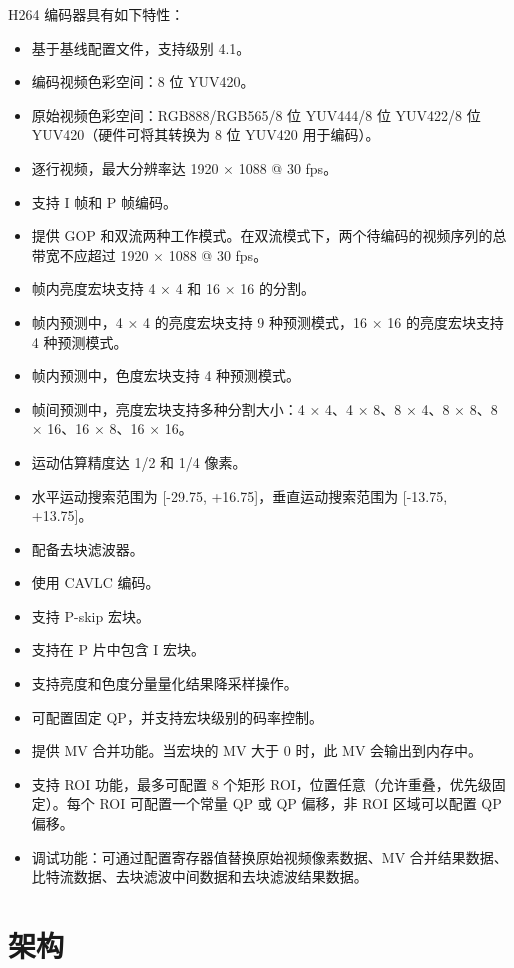 \documentclass[main\_\_CN.tex]{subfiles}
\begin{document}
H264 编码器具有如下特性：
\begin{itemize}
    \item 基于基线配置文件，支持级别 4.1。
    \item 编码视频色彩空间：8 位 YUV420。
    \item 原始视频色彩空间：RGB888/RGB565/8 位 YUV444/8 位 YUV422/8 位 YUV420（硬件可将其转换为 8 位 YUV420 用于编码）。
    \item 逐行视频，最大分辨率达 1920 × 1088 @ 30 fps。
    \item 支持 I 帧和 P 帧编码。
    \item 提供 GOP 和双流两种工作模式。在双流模式下，两个待编码的视频序列的总带宽不应超过 1920 × 1088 @ 30 fps。
    \item 帧内亮度宏块支持 4 × 4 和 16 × 16 的分割。
    \item 帧内预测中，4 × 4 的亮度宏块支持 9 种预测模式，16 × 16 的亮度宏块支持 4 种预测模式。
    \item 帧内预测中，色度宏块支持 4 种预测模式。
    \item 帧间预测中，亮度宏块支持多种分割大小：4 × 4、4 × 8、8 × 4、8 × 8、8 × 16、16 × 8、16 × 16。
    \item 运动估算精度达 1/2 和 1/4 像素。
    \item 水平运动搜索范围为 [-29.75, +16.75]，垂直运动搜索范围为 [-13.75, +13.75]。
    \item 配备去块滤波器。
    \item 使用 CAVLC 编码。
    \item 支持 P-skip 宏块。
    \item 支持在 P 片中包含 I 宏块。
    \item 支持亮度和色度分量量化结果降采样操作。
    \item 可配置固定 QP，并支持宏块级别的码率控制。
    \item 提供 MV 合并功能。当宏块的 MV 大于 0 时，此 MV 会输出到内存中。
    \item 支持 ROI 功能，最多可配置 8 个矩形 ROI，位置任意（允许重叠，优先级固定）。每个 ROI 可配置一个常量 QP 或 QP 偏移，非 ROI 区域可以配置 QP 偏移。
    \item 调试功能：可通过配置寄存器值替换原始视频像素数据、MV 合并结果数据、比特流数据、去块滤波中间数据和去块滤波结果数据。
\end{itemize}



\section{架构}
\label{sec:h264enc-arch-overview}
\end{document}
